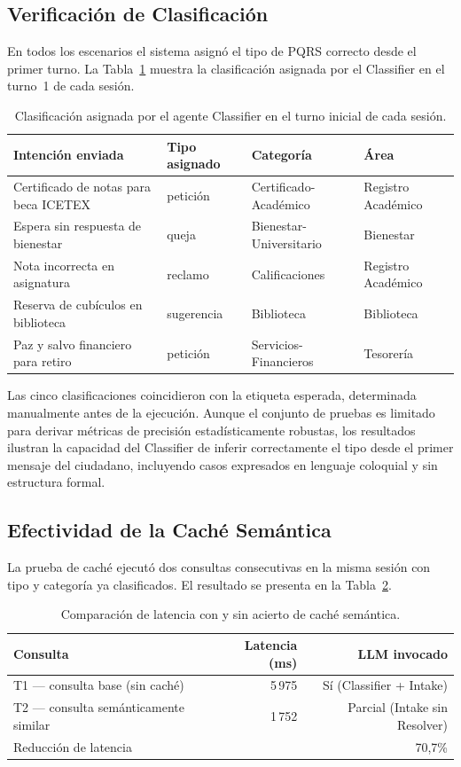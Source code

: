 \documentclass[runningheads]{llncs}
\begin{document}
\subsection{Verificación de Clasificación}

En todos los escenarios el sistema asignó el tipo de PQRS correcto desde el primer turno. La Tabla~\ref{tab:clasif} muestra la clasificación asignada por el Classifier en el turno~1 de cada sesión.

\begin{table}[h]
\caption{Clasificación asignada por el agente Classifier en el turno inicial de cada sesión.}
\label{tab:clasif}
\begin{tabular}{@{}llll@{}}
\toprule
\textbf{Intención enviada} & \textbf{Tipo asignado} & \textbf{Categoría} & \textbf{Área} \\
\midrule
Certificado de notas para beca ICETEX & petición & Certificado-Académico & Registro Académico \\
Espera sin respuesta de bienestar & queja & Bienestar-Universitario & Bienestar \\
Nota incorrecta en asignatura & reclamo & Calificaciones & Registro Académico \\
Reserva de cubículos en biblioteca & sugerencia & Biblioteca & Biblioteca \\
Paz y salvo financiero para retiro & petición & Servicios-Financieros & Tesorería \\
\bottomrule
\end{tabular}
\end{table}

Las cinco clasificaciones coincidieron con la etiqueta esperada, determinada manualmente antes de la ejecución. Aunque el conjunto de pruebas es limitado para derivar métricas de precisión estadísticamente robustas, los resultados ilustran la capacidad del Classifier de inferir correctamente el tipo desde el primer mensaje del ciudadano, incluyendo casos expresados en lenguaje coloquial y sin estructura formal.

\subsection{Efectividad de la Caché Semántica}

La prueba de caché ejecutó dos consultas consecutivas en la misma sesión con tipo y categoría ya clasificados. El resultado se presenta en la Tabla~\ref{tab:cache}.

\begin{table}[h]
\caption{Comparación de latencia con y sin acierto de caché semántica.}
\label{tab:cache}
\begin{tabular}{@{}lrr@{}}
\toprule
\textbf{Consulta} & \textbf{Latencia (ms)} & \textbf{LLM invocado} \\
\midrule
T1 — consulta base (sin caché) & 5\,975 & Sí (Classifier + Intake) \\
T2 — consulta semánticamente similar & 1\,752 & Parcial (Intake sin Resolver) \\
\midrule
Reducción de latencia & \multicolumn{2}{r}{70{,}7\%} \\
\bottomrule
\end{tabular}
\end{table}
\end{document}
